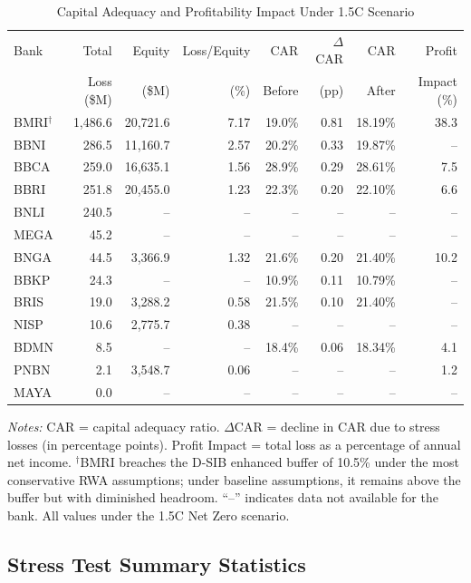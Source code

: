 \begin{table}[htbp]
\centering
\caption{Capital Adequacy and Profitability Impact Under 1.5\textdegree C Scenario}
\label{tab:full_car_results}
\footnotesize
\begin{tabular}{lrrrrrrr}
\toprule
Bank & Total & Equity & Loss/Equity & CAR & $\Delta$CAR & CAR & Profit \\
 & Loss (\$M) & (\$M) & (\%) & Before & (pp) & After & Impact (\%) \\
\midrule
BMRI$^{\dagger}$ & 1,486.6 & 20,721.6 & 7.17 & 19.0\% & 0.81 & 18.19\% & 38.3 \\
BBNI & 286.5 & 11,160.7 & 2.57 & 20.2\% & 0.33 & 19.87\% & -- \\
BBCA & 259.0 & 16,635.1 & 1.56 & 28.9\% & 0.29 & 28.61\% & 7.5 \\
BBRI & 251.8 & 20,455.0 & 1.23 & 22.3\% & 0.20 & 22.10\% & 6.6 \\
BNLI & 240.5 & -- & -- & -- & -- & -- & -- \\
MEGA & 45.2 & -- & -- & -- & -- & -- & -- \\
BNGA & 44.5 & 3,366.9 & 1.32 & 21.6\% & 0.20 & 21.40\% & 10.2 \\
BBKP & 24.3 & -- & -- & 10.9\% & 0.11 & 10.79\% & -- \\
BRIS & 19.0 & 3,288.2 & 0.58 & 21.5\% & 0.10 & 21.40\% & -- \\
NISP & 10.6 & 2,775.7 & 0.38 & -- & -- & -- & -- \\
BDMN & 8.5 & -- & -- & 18.4\% & 0.06 & 18.34\% & 4.1 \\
PNBN & 2.1 & 3,548.7 & 0.06 & -- & -- & -- & 1.2 \\
MAYA & 0.0 & -- & -- & -- & -- & -- & -- \\
\bottomrule
\end{tabular}

\smallskip
\noindent \textit{Notes:} CAR = capital adequacy ratio. $\Delta$CAR = decline in CAR due to stress losses (in percentage points). Profit Impact = total loss as a percentage of annual net income. $^{\dagger}$BMRI breaches the D-SIB enhanced buffer of 10.5\% under the most conservative RWA assumptions; under baseline assumptions, it remains above the buffer but with diminished headroom. ``--'' indicates data not available for the bank. All values under the 1.5\textdegree C Net Zero scenario.
\end{table}


\subsection{Stress Test Summary Statistics}
\label{subsec:stress_summary}

